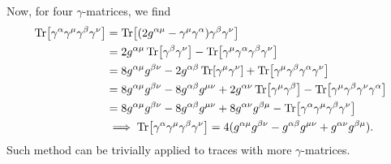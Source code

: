 \documentclass[11pt]{article}
\theoremstyle{definition}
\begin{document}
Now, for four $\gamma$-matrices, we find
\begin{equation}
\begin{aligned}
        \Tr[\gamma^\alpha\gamma^\mu\gamma^\beta\gamma^\nu] &= \Tr[(2g^{\alpha\mu}-\gamma^\mu\gamma^\alpha)\gamma^\beta\gamma^\nu] \\
        &= 2g^{\alpha\mu}\Tr[\gamma^\beta\gamma^\nu] - \Tr[\gamma^\mu\gamma^\alpha\gamma^\beta\gamma^\nu]\\
        &= 8g^{\alpha\mu}g^{\beta\nu} - 2g^{\alpha\beta}\Tr[\gamma^\mu\gamma^\nu] +\Tr[\gamma^\mu\gamma^\beta\gamma^\alpha\gamma^\nu] \\
        &= 8g^{\alpha\mu}g^{\beta\nu} - 8g^{\alpha\beta}g^{\mu\nu} +2g^{\alpha\nu}\Tr[\gamma^\mu\gamma^\beta] - \Tr[\gamma^\mu\gamma^\beta\gamma^\nu\gamma^\alpha]\\
        &=  8g^{\alpha\mu}g^{\beta\nu} - 8g^{\alpha\beta}g^{\mu\nu} +8g^{\alpha\nu}g^{\beta\mu} -\Tr[\gamma^\alpha\gamma^\mu\gamma^\beta\gamma^\nu]\\
        &\implies \Tr[\gamma^\alpha\gamma^\mu\gamma^\beta\gamma^\nu] = 4(g^{\alpha\mu}g^{\beta\nu} - g^{\alpha\beta}g^{\mu\nu} +g^{\alpha\nu}g^{\beta\mu}).
\end{aligned}
\end{equation}
Such method can be trivially applied to traces with more $\gamma$-matrices.
\end{document}
